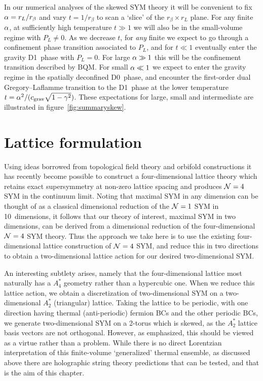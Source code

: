 In our numerical analyses of the skewed SYM theory it will be convenient to fix $\alpha = r_L / r_{\beta}$ and vary $t = 1 / r_{\beta}$ to scan a `slice' of the $r_{\beta} \times r_L$ plane.
For any finite $\alpha$, at sufficiently high temperature $t \gg 1$ we will also be in the small-volume regime with $P_L \ne 0$.
As we decrease $t$, for \emph{any} finite \al we expect to go through a confinement phase transition associated to $P_L$, and for $t \ll 1$ eventually enter the gravity D1~phase with $P_L = 0$.
For large $\alpha \gg 1$ this will be the confinement transition described by BQM.
For small $\alpha \ll 1$ we expect to enter the gravity regime in the spatially deconfined D0~phase, and encounter the first-order dual Gregory--Laflamme transition to the D1~phase at the lower temperature $t = \alpha^2 / (c_{\text{grav}} \sqrt{1 - \gamma^2})$.
These expectations for large, small and intermediate \al are illustrated in figure~\ref{fig:summaryskew}.

\section{\label{sec:lattice}Lattice formulation}
Using ideas borrowed from topological field theory and orbifold constructions it has recently become possible to construct a four-dimensional lattice theory which retains exact supersymmetry at non-zero lattice spacing and produces $\mathcal N = 4$ SYM in the continuum limit.
Noting that maximal SYM in any dimension can be thought of as a classical dimensional reduction of the $\mathcal N = 1$ SYM in 10~dimensions, it follows that our theory of interest, maximal SYM in two dimensions, can be derived from a dimensional reduction of the four-dimensional $\mathcal N = 4$ SYM theory.
Thus the approach we take here is to use the existing four-dimensional lattice construction of $\mathcal N = 4$ SYM, and reduce this in two directions to obtain a two-dimensional lattice action for our desired two-dimensional SYM.

An interesting subtlety arises, namely that the four-dimensional lattice most naturally has a $A_4^*$ geometry rather than a hypercubic one.
When we reduce this lattice action, we obtain a discretization of two-dimensional SYM on a two-dimensional $A_2^*$ (triangular) lattice.
Taking the lattice to be periodic, with one direction having thermal (anti-periodic) fermion BCs and the other periodic BCs, we generate two-dimensional SYM on a 2-torus which is skewed, as the $A_2^*$ lattice basis vectors are not orthogonal.
However, as emphasized, this should be viewed as a virtue rather than a problem.
While there is no direct Lorentzian interpretation of this finite-volume `generalized' thermal ensemble, as discussed above there are holographic string theory predictions that can be tested, and that is the aim of this chapter.

